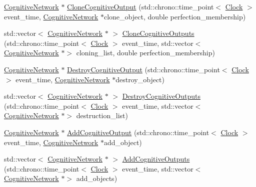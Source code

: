 \begin{DoxyCompactItemize}
\item 
\mbox{\hyperlink{classCognitiveNetwork}{Cognitive\+Network}} $\ast$ \mbox{\hyperlink{classCognitiveNetwork_ab24f74115c11275f365245a4bb826c91}{Clone\+Cognitive\+Output}} (std\+::chrono\+::time\+\_\+point$<$ \mbox{\hyperlink{universe_8h_a0ef8d951d1ca5ab3cfaf7ab4c7a6fd80}{Clock}} $>$ event\+\_\+time, \mbox{\hyperlink{classCognitiveNetwork}{Cognitive\+Network}} $\ast$clone\+\_\+object, double perfection\+\_\+membership)
\item 
std\+::vector$<$ \mbox{\hyperlink{classCognitiveNetwork}{Cognitive\+Network}} $\ast$ $>$ \mbox{\hyperlink{classCognitiveNetwork_a5734aa5378e9b701dca5e98017c1ea35}{Clone\+Cognitive\+Outputs}} (std\+::chrono\+::time\+\_\+point$<$ \mbox{\hyperlink{universe_8h_a0ef8d951d1ca5ab3cfaf7ab4c7a6fd80}{Clock}} $>$ event\+\_\+time, std\+::vector$<$ \mbox{\hyperlink{classCognitiveNetwork}{Cognitive\+Network}} $\ast$$>$ cloning\+\_\+list, double perfection\+\_\+membership)
\item 
\mbox{\hyperlink{classCognitiveNetwork}{Cognitive\+Network}} $\ast$ \mbox{\hyperlink{classCognitiveNetwork_a8475cf7277d25532bb31926e768600e8}{Destroy\+Cognitive\+Output}} (std\+::chrono\+::time\+\_\+point$<$ \mbox{\hyperlink{universe_8h_a0ef8d951d1ca5ab3cfaf7ab4c7a6fd80}{Clock}} $>$ event\+\_\+time, \mbox{\hyperlink{classCognitiveNetwork}{Cognitive\+Network}} $\ast$destroy\+\_\+object)
\item 
std\+::vector$<$ \mbox{\hyperlink{classCognitiveNetwork}{Cognitive\+Network}} $\ast$ $>$ \mbox{\hyperlink{classCognitiveNetwork_ad08191cbab02f26f69d25bc7e6b5c1ee}{Destroy\+Cognitive\+Outputs}} (std\+::chrono\+::time\+\_\+point$<$ \mbox{\hyperlink{universe_8h_a0ef8d951d1ca5ab3cfaf7ab4c7a6fd80}{Clock}} $>$ event\+\_\+time, std\+::vector$<$ \mbox{\hyperlink{classCognitiveNetwork}{Cognitive\+Network}} $\ast$$>$ destruction\+\_\+list)
\item 
\mbox{\hyperlink{classCognitiveNetwork}{Cognitive\+Network}} $\ast$ \mbox{\hyperlink{classCognitiveNetwork_a8a9b533b89b7d62b21cf41bdf957ef14}{Add\+Cognitive\+Output}} (std\+::chrono\+::time\+\_\+point$<$ \mbox{\hyperlink{universe_8h_a0ef8d951d1ca5ab3cfaf7ab4c7a6fd80}{Clock}} $>$ event\+\_\+time, \mbox{\hyperlink{classCognitiveNetwork}{Cognitive\+Network}} $\ast$add\+\_\+object)
\item 
std\+::vector$<$ \mbox{\hyperlink{classCognitiveNetwork}{Cognitive\+Network}} $\ast$ $>$ \mbox{\hyperlink{classCognitiveNetwork_a6299433811b76f0ccb97cf69fe9bfb66}{Add\+Cognitive\+Outputs}} (std\+::chrono\+::time\+\_\+point$<$ \mbox{\hyperlink{universe_8h_a0ef8d951d1ca5ab3cfaf7ab4c7a6fd80}{Clock}} $>$ event\+\_\+time, std\+::vector$<$ \mbox{\hyperlink{classCognitiveNetwork}{Cognitive\+Network}} $\ast$$>$ add\+\_\+objects)
$$
\end{DoxyCompactItemize}
